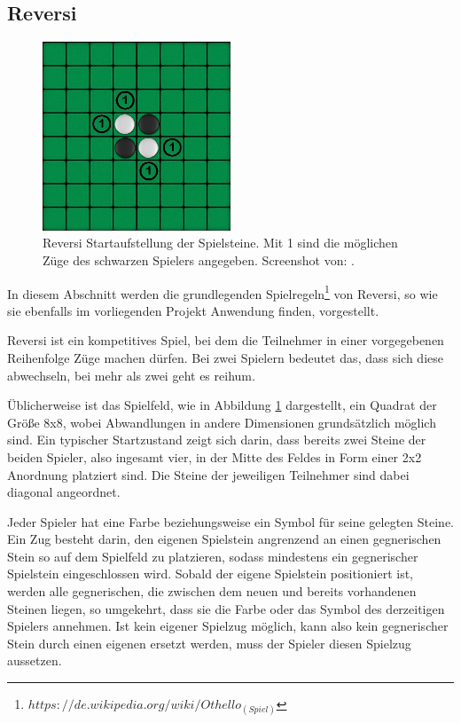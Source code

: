 \subsection{Reversi}

\begin{figure}
	\centering
	\includegraphics[width=0.5\textwidth]{pics/reversi_start.png}	
	\caption{Reversi Startaufstellung der Spielsteine. Mit 1 sind die m\"{o}glichen Z\"{u}ge des schwarzen Spielers angegeben. Screenshot von: \cite{PlayReversi}.}
	\label{fig:reversi_start}
\end{figure}

In diesem Abschnitt werden die grundlegenden Spielregeln\footnote{$https://de.wikipedia.org/wiki/Othello_(Spiel)$} von Reversi, so wie sie ebenfalls im vorliegenden Projekt Anwendung finden, vorgestellt.

Reversi ist ein kompetitives Spiel, bei dem die Teilnehmer in einer vorgegebenen Reihenfolge Z\"{u}ge machen d\"{u}rfen. Bei zwei Spielern bedeutet das, dass sich diese abwechseln, bei mehr als zwei geht es reihum. 

\"{U}blicherweise ist das Spielfeld, wie in Abbildung \ref{fig:reversi_start} dargestellt, ein Quadrat der Gr\"{o}\ss e 8x8, wobei Abwandlungen in andere Dimensionen grunds\"{a}tzlich m\"{o}glich sind. Ein typischer Startzustand zeigt sich darin, dass bereits zwei Steine der beiden Spieler, also ingesamt vier, in der Mitte des Feldes in Form einer 2x2 Anordnung platziert sind. Die Steine der jeweiligen Teilnehmer sind dabei diagonal angeordnet.

Jeder Spieler hat eine Farbe beziehungsweise ein Symbol f\"{u}r seine gelegten Steine. Ein Zug besteht darin, den eigenen Spielstein angrenzend an einen gegnerischen Stein so auf dem Spielfeld zu platzieren, sodass mindestens ein gegnerischer Spielstein eingeschlossen wird.  Sobald der eigene Spielstein positioniert ist, werden alle gegnerischen, die zwischen dem neuen und bereits vorhandenen Steinen liegen, so umgekehrt, dass sie die Farbe oder das Symbol des derzeitigen Spielers annehmen. Ist kein eigener Spielzug m\"{o}glich, kann also kein gegnerischer Stein durch einen eigenen ersetzt werden, muss der Spieler diesen Spielzug aussetzen. 

